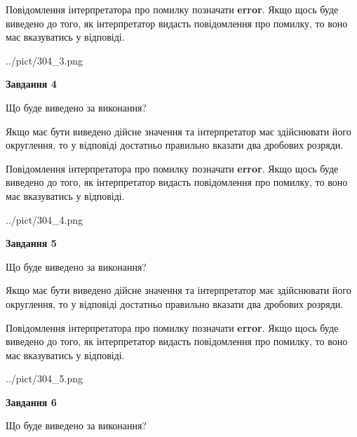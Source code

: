 \documentclass[12pt, ukrainian]{article}
\begin{document}
{\begin {Large}
Повідомлення інтерпретатора про помилку позначати \textbf{error}.
Якщо щось буде виведено до того, як інтерпретатор видасть повідомлення про помилку, 
то воно має вказуватись у відповіді. \par

\begin{center}
	{../pict/304_3.png}
\end{center}
\newpage

{\begin {center}\textbf{Завдання 4}\end {center}}\par
Що буде виведено за виконання? \par

Якщо має бути виведено дійсне значення та інтерпретатор має здійснювати його округлення, 
то у відповіді достатньо правильно вказати два дробових розряди.

Повідомлення інтерпретатора про помилку позначати \textbf{error}.
Якщо щось буде виведено до того, як інтерпретатор видасть повідомлення про помилку, 
то воно має вказуватись у відповіді. \par

\begin{center}
	{../pict/304_4.png}
\end{center}
\newpage

{\begin {center}\textbf{Завдання 5}\end {center}}\par
Що буде виведено за виконання? \par

Якщо має бути виведено дійсне значення та інтерпретатор має здійснювати його округлення, 
то у відповіді достатньо правильно вказати два дробових розряди.

Повідомлення інтерпретатора про помилку позначати \textbf{error}.
Якщо щось буде виведено до того, як інтерпретатор видасть повідомлення про помилку, 
то воно має вказуватись у відповіді. \par

\begin{center}
	{../pict/304_5.png}
\end{center}
\newpage

{\begin {center}\textbf{Завдання 6}\end {center}}\par
Що буде виведено за виконання? \par


\end{Large}}
\end{document}
